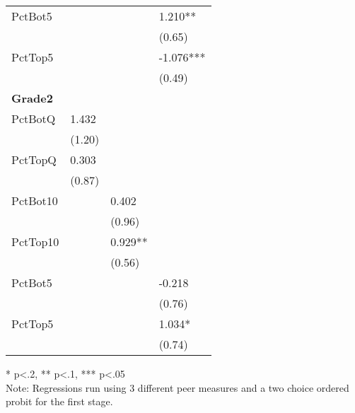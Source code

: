 \begin{table}[htb]
\begin{threeparttable}
\begin{tabular}{l l l l}
      PctBot5         &                               &                               & 1.210**                      \\
                      &                               &                               & (0.65)                       \\
      PctTop5         &                               &                               & -1.076***                    \\
                      &                               &                               & (0.49)                       \\
      \hline
      \textbf{Grade2} &                               &                               &                              \\
      PctBotQ         & 1.432                         &                               &                              \\
                      & (1.20)                        &                               &                              \\
      PctTopQ         & 0.303                         &                               &                              \\
                      & (0.87)                        &                               &                              \\
      PctBot10        &                               & 0.402                         &                              \\
                      &                               & (0.96)                        &                              \\
      PctTop10        &                               & 0.929**                       &                              \\
                      &                               & (0.56)                        &                              \\
      PctBot5         &                               &                               & -0.218                       \\
                      &                               &                               & (0.76)                       \\
      PctTop5         &                               &                               & 1.034*                       \\
                      &                               &                               & (0.74)                       \\
      \hline
      \hline
    \end{tabular}
    \begin{tablenotes}
    \item{* p<.2, ** p<.1, *** p<.05 \\Note: Regressions run using 3 different peer measures and a two choice ordered probit for the first stage.}
    \end{tablenotes}
  \end{threeparttable}
\end{table}

